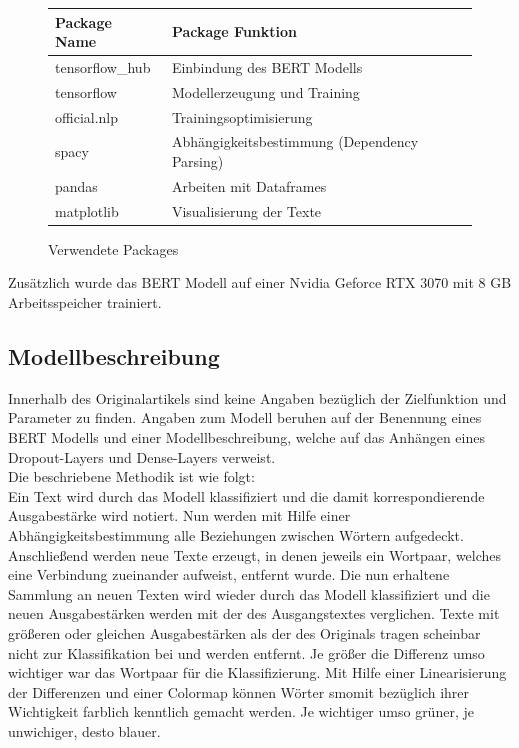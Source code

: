\documentclass[DIV=13,fontsize=11pt]{scrartcl}
\begin{document}
\begin{figure}[H]
    \centering
    \begin{tabular}{ll}
        \toprule
        Package Name    & Package Funktion                             \\
        \midrule
        tensorflow\_hub & Einbindung des BERT Modells                  \\
        tensorflow      & Modellerzeugung und Training                 \\
        official.nlp    & Trainingsoptimisierung                       \\
        spacy           & Abhängigkeitsbestimmung (Dependency Parsing) \\
        pandas          & Arbeiten mit Dataframes                      \\
        matplotlib      & Visualisierung der Texte                     \\
        \bottomrule
    \end{tabular}
    \caption{Verwendete Packages}
    \label{fig:packages}
\end{figure}

Zusätzlich wurde das BERT Modell auf einer Nvidia Geforce RTX 3070 mit 8 GB Arbeitsspeicher
trainiert.

\subsection{Modellbeschreibung}

Innerhalb des Originalartikels sind keine Angaben bezüglich der Zielfunktion und
Parameter zu finden. Angaben zum Modell beruhen auf der Benennung eines BERT Modells und
einer Modellbeschreibung, welche auf das Anhängen eines Dropout-Layers und
Dense-Layers verweist.\\

Die beschriebene Methodik ist wie folgt:\\

Ein Text wird durch das Modell klassifiziert und die damit korrespondierende
Ausgabestärke wird notiert. Nun werden mit Hilfe einer Abhängigkeitsbestimmung
alle Beziehungen zwischen Wörtern aufgedeckt. Anschließend werden neue Texte
erzeugt, in denen jeweils ein Wortpaar, welches eine Verbindung zueinander
aufweist, entfernt wurde. Die nun erhaltene Sammlung an neuen Texten wird wieder
durch das Modell klassifiziert und die neuen Ausgabestärken werden mit der
des Ausgangstextes verglichen. Texte mit größeren oder gleichen Ausgabestärken
als der des Originals tragen scheinbar nicht zur Klassifikation bei und werden
entfernt. Je größer die Differenz umso wichtiger war das
Wortpaar für die Klassifizierung. Mit Hilfe einer Linearisierung der Differenzen
und einer Colormap können Wörter smomit bezüglich ihrer Wichtigkeit
farblich kenntlich gemacht werden. Je wichtiger umso grüner, je unwichiger, desto blauer.
\end{document}
